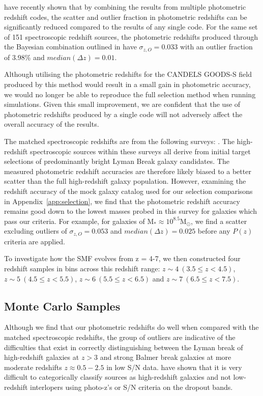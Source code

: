 \citet{Dahlen:2013eu} have recently shown that by combining the results from multiple photometric redshift codes, the scatter and outlier fraction in photometric redshifts can be significantly reduced compared to the results of any single code. For the same set of 151 spectroscopic redshift sources, the photometric redshifts produced through the Bayesian combination outlined in \citet{Dahlen:2013eu} have $\sigma_{z,O} = 0.033$ with an outlier fraction of 3.98\% and $median(\Delta z) = 0.01$. 

Although utilising the photometric redshifts for the CANDELS GOODS-S field produced by this method would result in a small gain in photometric accuracy, we would no longer be able to reproduce the full selection method when running simulations. Given this small improvement, we are confident that the use of photometric redshifts produced by a single code will not adversely affect the overall accuracy of the results.

The matched spectroscopic redshifts are from the following surveys: \citet{LeFvre:2004ge,Stanway:2004gu,Vanzella:2008hp,Hathi:2008ca,Popesso:2009ht,Wuyts:2009gv,Rhoads:2009eb,Vanzella:2009ez,Balestra:2010bt,Kurk:2012ej}. The high-redshift spectroscopic sources within these surveys all derive from initial target selections of predominantly bright Lyman Break galaxy candidates. The measured photometric redshift accuracies are therefore likely biased to a better scatter than the full high-redshift galaxy population. However, examining the redshift accuracy of the mock galaxy catalog used for our selection comparisons in Appendix~\ref{app:selection}, we find that the photometric redshift accuracy remains good down to the lowest masses probed in this survey for galaxies which pass our criteria. For example, for galaxies of $\text{M}_{*} \approx 10^{8.5} \text{M}_{\odot}$, we find a scatter excluding outliers of $\sigma_{z,O} = 0.053$ and $median(\Delta z) = 0.025$ before any $P(z)$ criteria are applied.

To investigate how the SMF evolves from z = 4-7, we then constructed four redshift samples in bins across this redshift range: $z \sim 4 ~(3.5 \leq z < 4.5)$, $z \sim 5~ (4.5 \leq z < 5.5)$, $z \sim 6~(5.5 \leq z < 6.5)$ and $z \sim 7 ~(6.5 \leq z < 7.5)$.

\subsection{Monte Carlo Samples}\label{sec:MC}
Although we find that our photometric redshifts do well when compared with the matched spectroscopic redshifts, the group of outliers are indicative of the difficulties that exist in correctly distinguishing between the Lyman break of high-redshift galaxies at $z > 3$ and strong Balmer break galaxies at more moderate redshifts $z \approx 0.5-2.5$ in low S/N data. \citet{2012ApJ...748..122P,Pirzkal:2013ug} have shown that it is very difficult to categorically classify sources as high-redshift galaxies and not low-redshift interlopers using photo-z's or S/N criteria on the dropout bands.

